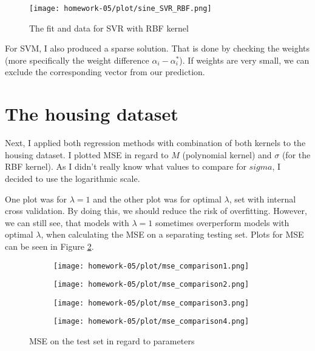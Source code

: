 \documentclass{article}
\begin{document}
\begin{figure}[!h]
    \centering
    \texttt{[image: homework-05/plot/sine\_SVR\_RBF.png]}
    \caption{The fit and data for SVR with RBF kernel}
    \label{fig:sine_SVR_RBF}
\end{figure}

For SVM, I also produced a sparse solution. That is done by checking the weights (more specifically the weight difference $\alpha_i - \alpha_i^*$). If weights are very small, we can exclude the corresponding vector from our prediction.

\section{The housing dataset}

Next, I applied both regression methods with combination of both kernels to the housing dataset. I plotted MSE in regard to $M$ (polynomial kernel) and $\sigma$ (for the RBF kernel). As I didn't really know what values to compare for $sigma$, I decided to use the logarithmic scale. 

One plot was for $\lambda=1$ and the other plot was for optimal $\lambda$, set with internal cross validation. By doing this, we should reduce the risk of overfitting. However, we can still see, that models with $\lambda=1$ sometimes overperform models with optimal $\lambda$, when calculating the MSE on a separating testing set. Plots for MSE can be seen in Figure \ref{fig:comparison}. 

\begin{figure}[!h]
    \centering
    
    \begin{subfigure}[b]{0.45\textwidth}
        \texttt{[image: homework-05/plot/mse\_comparison1.png]}
    \end{subfigure}
    \hfill
    \begin{subfigure}[b]{0.45\textwidth}
        \texttt{[image: homework-05/plot/mse\_comparison2.png]}
    \end{subfigure}
    
    \vspace{0.5cm}
    
    \begin{subfigure}[b]{0.45\textwidth}
        \texttt{[image: homework-05/plot/mse\_comparison3.png]}
    \end{subfigure}
    \hfill
    \begin{subfigure}[b]{0.45\textwidth}
        \texttt{[image: homework-05/plot/mse\_comparison4.png]}
    \end{subfigure}
    
    \caption{MSE on the test set in regard to parameters}
    \label{fig:comparison}
\end{figure}
\end{document}
